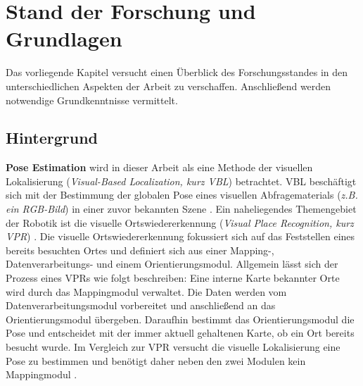 
\section{Stand der Forschung und Grundlagen}
\label{sec:kapitel_2}
Das vorliegende Kapitel versucht einen Überblick des Forschungsstandes in den unterschiedlichen Aspekten der Arbeit zu verschaffen. Anschließend werden notwendige Grundkenntnisse vermittelt.

\subsection{Hintergrund}


\textbf{Pose Estimation} wird in dieser Arbeit als eine Methode der visuellen Lokalisierung (\textit{Visual-Based Localization, kurz VBL}) betrachtet. VBL beschäftigt sich mit der Bestimmung der globalen Pose eines visuellen Abfragematerials (\textit{z.B. ein RGB-Bild}) in einer zuvor bekannten Szene \cite{piascoSurveyVisualBasedLocalization2018}.
Ein naheliegendes Themengebiet der Robotik ist die visuelle Ortswiedererkennung (\textit{Visual Place Recognition, kurz VPR}) \cite{lowryVisualPlaceRecognition2016}. Die visuelle Ortswiedererkennung fokussiert sich auf das Feststellen eines bereits besuchten Ortes und definiert sich aus einer Mapping-, Datenverarbeitungs- und einem Orientierungsmodul. Allgemein lässt sich der Prozess eines VPRs wie folgt beschreiben: Eine interne Karte bekannter Orte wird durch das Mappingmodul verwaltet. Die Daten werden vom Datenverarbeitungsmodul vorbereitet und anschließend an das Orientierungsmodul übergeben. Daraufhin bestimmt das Orientierungsmodul die Pose und entscheidet mit der immer aktuell gehaltenen Karte, ob ein Ort bereits besucht wurde. Im Vergleich zur VPR versucht die visuelle Lokalisierung eine Pose zu bestimmen und benötigt daher neben den zwei Modulen kein Mappingmodul \cite{lowryVisualPlaceRecognition2016}.

